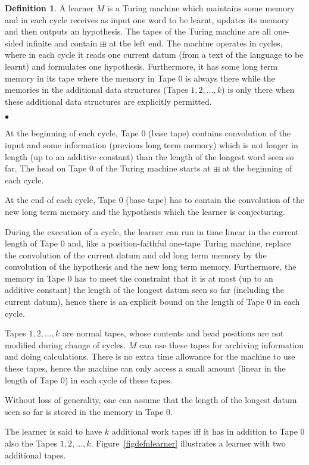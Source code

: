 \documentclass{LMCS}
\theoremstyle{plain}\newtheorem{athm}[thm]{Theorem}
\theoremstyle{plain}\newtheorem{aprop}[thm]{Proposition}
\theoremstyle{plain}\newtheorem{aprob}[thm]{Open Problem}
\theoremstyle{plain}\newtheorem{acor}[thm]{Corollary}
\theoremstyle{plain}\newtheorem{alem}[thm]{Lemma}
\theoremstyle{definition}\newtheorem{adefn}[thm]{Definition}
\theoremstyle{definition}\newtheorem{arem}[thm]{Remark}
\theoremstyle{plain}\newtheorem{aexmp}[thm]{Example}
\theoremstyle{plain}\newtheorem{aclm}[thm]{Claim}
\begin{document}
\begin{adefn}
A learner $M$ is a Turing machine which maintains some memory and in each
cycle receives as input one word to be learnt, updates its memory
and then outputs an hypothesis.
The tapes of the Turing machine are all one-sided
infinite and contain $\boxplus$
at the left end. The machine operates in cycles, where in each cycle
it reads one current datum (from a text of the language to be learnt)
and formulates one hypothesis. Furthermore, it has some long term memory
in its tape where the memory in Tape $0$ is always there while the
memories in the additional data structures (Tapes $1,2,\ldots,k$)
is only there when these additional data structures are explicitly
permitted.
\begin{iteMize}{$\bullet$}
\item At the beginning of each cycle,
      Tape $0$ (base tape) contains convolution of the input
      and some information (previous long term memory) which is not 
      longer in length (up to an additive
      constant) than the length of the longest word seen so far.
      The head on Tape $0$ of the Turing machine starts at $\boxplus$ at
      the beginning of each cycle.
\item At the end of each cycle,
      Tape $0$ (base tape) has to contain the convolution of
      the new long term memory and the hypothesis which the
      learner is conjecturing.
\item During the execution of a cycle, the learner
      can run in time linear in the current length of Tape $0$
      and, like a position-faithful one-tape Turing machine,
      replace the convolution of the current datum and old long term
      memory by the convolution of the hypothesis and the new long term
      memory. Furthermore, the memory in Tape $0$ 
      has to meet the constraint that
      it is at most (up to an additive constant) the length of the longest 
      datum seen so far (including the current datum), hence there
      is an explicit bound on the length of Tape $0$ in each cycle.
\item Tapes $1,2,\ldots,k$ are normal tapes, whose contents and head positions
      are not modified during change of cycles. $M$ can use these tapes
      for archiving information and doing calculations. There is
      no extra time allowance for the machine to use these tapes, hence
      the machine can only access a small amount (linear in the length
      of Tape $0$) in each cycle of these tapes.
\item Without loss of generality, one can assume that the length of the
      longest datum seen so far is stored in the memory in Tape $0$.
\end{iteMize}
The learner is said to have $k$ additional work tapes iff
it has in addition to Tape $0$ also the Tapes $1,2,\ldots,k$.
Figure~\ref{figdefnlearner} illustrates a learner with two additional tapes.
\end{adefn}
\end{document}
